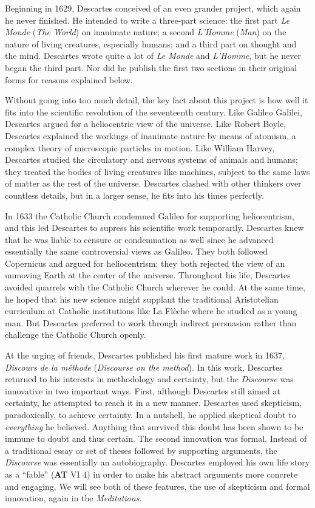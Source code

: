 Beginning in 1629, Descartes conceived of an even grander project, which again he never finished. He intended to write a three-part science: the first part \textit{Le Monde} (\textit{The World}) on inanimate nature; a second \textit{L'Homme} (\textit{Man}) on the nature of living creatures, especially humans; and a third part on thought and the mind. Descartes wrote quite a lot of \textit{Le Monde} and \textit{L'Homme}, but he never began the third part. Nor did he publish the first two sections in their original forms for reasons explained below.

Without going into too much detail, the key fact about this project is how well it fits into the scientific revolution of the seventeenth century. Like Galileo Galilei, Descartes argued for a heliocentric view of the universe. Like Robert Boyle, Descartes explained the workings of inanimate nature by means of atomism, a complex theory of microscopic particles in motion. Like William Harvey, Descartes studied the circulatory and nervous systems of animals and humans; they treated the bodies of living creatures like machines, subject to the same laws of matter as the rest of the universe. Descartes clashed with other thinkers over countless details, but in a larger sense, he fits into his times perfectly.

In 1633 the Catholic Church condemned Galileo for supporting heliocentrism, and this led Descartes to supress his scientific work temporarily. Descartes knew that he was liable to censure or condemnation as well since he advanced essentially the same controversial views as Galileo. They both followed Copernicus and argued for heliocentrism; they both rejected the view of an unmoving Earth at the center of the universe. Throughout his life, Descartes avoided quarrels with the Catholic Church wherever he could. At the same time, he hoped that his new science might supplant the traditional Aristotelian curriculum at Catholic institutions like La Flèche where he studied as a young man. But Descartes preferred to work through indirect persuasion rather than challenge the Catholic Church openly.

At the urging of friends, Descartes published his first mature work in 1637, \textit{Discours de la méthode} (\textit{Discourse on the method}). In this work, Descartes returned to his interests in methodology and certainty, but the \textit{Discourse} was innovative in two important ways. First, although Descartes still aimed at certainty, he attempted to reach it in a new manner. Descartes used skepticism, paradoxically, to achieve certainty. In a nutshell, he applied skeptical doubt to \textit{everything} he believed. Anything that survived this doubt has been shown to be immune to doubt and thus certain. The second innovation was formal. Instead of a traditional essay or set of theses followed by supporting arguments, the \textit{Discourse} was essentially an autobiography. Descartes employed his own life story as a ``fable'' (\textbf{AT} VI 4) in order to make his abstract arguments more concrete and engaging. We will see both of these features, the use of skepticism and formal innovation, again in the \textit{Meditations}.

